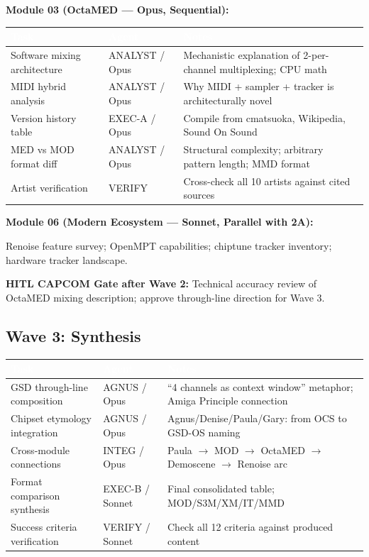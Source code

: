 \documentclass[11pt,letterpaper]{article}
\newcommand{\tableheader}[1]{\textbf{\sffamily\textcolor{white}{#1}}}
\begin{document}
\textbf{Module 03 (OctaMED --- Opus, Sequential):}

\begin{center}
\begin{tabularx}{\textwidth}{L{4cm}L{2.5cm}X}
\toprule
{}
\tableheader{Task} & \tableheader{Agent} & \tableheader{Notes} \\
\midrule
Software mixing architecture & ANALYST / Opus & Mechanistic explanation of 2-per-channel multiplexing; CPU math \\
MIDI hybrid analysis & ANALYST / Opus & Why MIDI + sampler + tracker is architecturally novel \\
Version history table & EXEC-A / Opus & Compile from cmatsuoka, Wikipedia, Sound On Sound \\
MED vs MOD format diff & ANALYST / Opus & Structural complexity; arbitrary pattern length; MMD format \\
Artist verification & VERIFY & Cross-check all 10 artists against cited sources \\
\bottomrule
\end{tabularx}
\end{center}

\textbf{Module 06 (Modern Ecosystem --- Sonnet, Parallel with 2A):}

Renoise feature survey; OpenMPT capabilities; chiptune tracker inventory; hardware tracker landscape.

\textbf{HITL CAPCOM Gate after Wave 2:} Technical accuracy review of OctaMED mixing description; approve through-line direction for Wave 3.

\subsection{Wave 3: Synthesis}

\begin{center}
\begin{tabularx}{\textwidth}{L{4cm}L{2.5cm}X}
\toprule
{}
\tableheader{Task} & \tableheader{Agent} & \tableheader{Notes} \\
\midrule
GSD through-line composition & AGNUS / Opus & ``4 channels as context window'' metaphor; Amiga Principle connection \\
Chipset etymology integration & AGNUS / Opus & Agnus/Denise/Paula/Gary: from OCS to GSD-OS naming \\
Cross-module connections & INTEG / Opus & Paula $\to$ MOD $\to$ OctaMED $\to$ Demoscene $\to$ Renoise arc \\
Format comparison synthesis & EXEC-B / Sonnet & Final consolidated table; MOD/S3M/XM/IT/MMD \\
Success criteria verification & VERIFY / Sonnet & Check all 12 criteria against produced content \\
\bottomrule
\end{tabularx}
\end{center}
\end{document}
